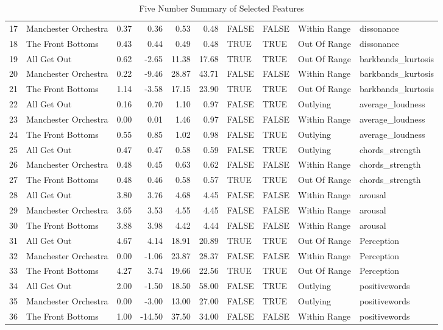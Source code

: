 \documentclass{article}\usepackage[]{graphicx}\usepackage[]{xcolor}
\begin{document}
\begin{table}[ht]
\begin{tabular}{rlrrrrllll}
  17 & Manchester Orchestra & 0.37 & 0.36 & 0.53 & 0.48 & FALSE & FALSE & Within Range & dissonance \\ 
  18 & The Front Bottoms & 0.43 & 0.44 & 0.49 & 0.48 & TRUE & TRUE & Out Of Range & dissonance \\ 
  19 & All Get Out & 0.62 & -2.65 & 11.38 & 17.68 & TRUE & TRUE & Out Of Range & barkbands\_kurtosis \\ 
  20 & Manchester Orchestra & 0.22 & -9.46 & 28.87 & 43.71 & FALSE & FALSE & Within Range & barkbands\_kurtosis \\ 
  21 & The Front Bottoms & 1.14 & -3.58 & 17.15 & 23.90 & TRUE & TRUE & Out Of Range & barkbands\_kurtosis \\ 
  22 & All Get Out & 0.16 & 0.70 & 1.10 & 0.97 & FALSE & TRUE & Outlying & average\_loudness \\ 
  23 & Manchester Orchestra & 0.00 & 0.01 & 1.46 & 0.97 & FALSE & FALSE & Within Range & average\_loudness \\ 
  24 & The Front Bottoms & 0.55 & 0.85 & 1.02 & 0.98 & FALSE & TRUE & Outlying & average\_loudness \\ 
  25 & All Get Out & 0.47 & 0.47 & 0.58 & 0.59 & FALSE & TRUE & Outlying & chords\_strength \\ 
  26 & Manchester Orchestra & 0.48 & 0.45 & 0.63 & 0.62 & FALSE & FALSE & Within Range & chords\_strength \\ 
  27 & The Front Bottoms & 0.48 & 0.46 & 0.58 & 0.57 & TRUE & TRUE & Out Of Range & chords\_strength \\ 
  28 & All Get Out & 3.80 & 3.76 & 4.68 & 4.45 & FALSE & FALSE & Within Range & arousal \\ 
  29 & Manchester Orchestra & 3.65 & 3.53 & 4.55 & 4.45 & FALSE & FALSE & Within Range & arousal \\ 
  30 & The Front Bottoms & 3.88 & 3.98 & 4.42 & 4.44 & FALSE & FALSE & Within Range & arousal \\ 
  31 & All Get Out & 4.67 & 4.14 & 18.91 & 20.89 & TRUE & TRUE & Out Of Range & Perception \\ 
  32 & Manchester Orchestra & 0.00 & -1.06 & 23.87 & 28.37 & FALSE & FALSE & Within Range & Perception \\ 
  33 & The Front Bottoms & 4.27 & 3.74 & 19.66 & 22.56 & TRUE & TRUE & Out Of Range & Perception \\ 
  34 & All Get Out & 2.00 & -1.50 & 18.50 & 58.00 & FALSE & TRUE & Outlying & positivewords \\ 
  35 & Manchester Orchestra & 0.00 & -3.00 & 13.00 & 27.00 & FALSE & TRUE & Outlying & positivewords \\ 
  36 & The Front Bottoms & 1.00 & -14.50 & 37.50 & 34.00 & FALSE & FALSE & Within Range & positivewords \\ 
   \hline
\end{tabular}
\caption{Five Number Summary of Selected Features} 
\label{compared.features}
\end{table}



\onecolumn
\end{document}
